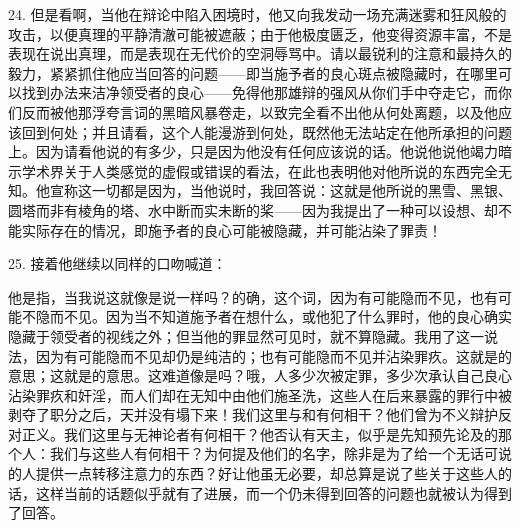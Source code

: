 24. 但是看啊，当他在辩论中陷入困境时，他又向我发动一场充满迷雾和狂风般的攻击，以便真理的平静清澈可能被遮蔽；由于他极度匮乏，他变得资源丰富，不是表现在说出真理，而是表现在无代价的空洞辱骂中。请以最锐利的注意和最持久的毅力，紧紧抓住他应当回答的问题——即当施予者的良心斑点被隐藏时，在哪里可以找到办法来洁净领受者的良心——免得他那雄辩的强风从你们手中夺走它，而你们反而被他那浮夸言词的黑暗风暴卷走，以致完全看不出他从何处离题，以及他应该回到何处；并且请看，这个人能漫游到何处，既然他无法站定在他所承担的问题上。因为请看他说的有多少，只是因为他没有任何应该说的话。他说他说他竭力暗示学术界关于人类感觉的虚假或错误的看法，在此也表明他对他所说的东西完全无知。他宣称这一切都是因为，当他说时，我回答说：这就是他所说的黑雪、黑银、圆塔而非有棱角的塔、水中断而实未断的桨——因为我提出了一种可以设想、却不能实际存在的情况，即施予者的良心可能被隐藏，并可能沾染了罪责！\par

25. 接着他继续以同样的口吻喊道：\par

\par

他是指，当我说这就像是说一样吗？的确，这个词，因为有可能隐而不见，也有可能不隐而不见。因为当不知道施予者在想什么，或他犯了什么罪时，他的良心确实隐藏于领受者的视线之外；但当他的罪显然可见时，就不算隐藏。我用了这一说法，因为有可能隐而不见却仍是纯洁的；也有可能隐而不见并沾染罪疚。这就是的意思；这就是的意思。这难道像是吗？哦，人多少次被定罪，多少次承认自己良心沾染罪疚和奸淫，而人们却在无知中由他们施圣洗，这些人在后来暴露的罪行中被剥夺了职分之后，天并没有塌下来！我们这里与和有何相干？他们曾为不义辩护反对正义。我们这里与无神论者有何相干？他否认有天主，似乎是先知预先论及的那个人：我们与这些人有何相干？为何提及他们的名字，除非是为了给一个无话可说的人提供一点转移注意力的东西？好让他虽无必要，却总算是说了些关于这些人的话，这样当前的话题似乎就有了进展，而一个仍未得到回答的问题也就被认为得到了回答。\par

